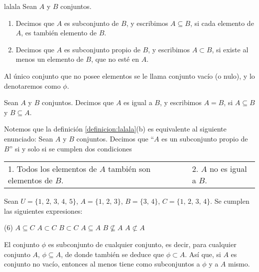 \begin{definicion}{}{lalala}
    Sean $A$ y $B$ conjuntos.
    \begin{enumerate}[label=\alph*)]
        \item Decimos que $A$ es subconjunto de $B$, y escribimos $A \subseteq B$, si cada elemento de $A$, es también elemento de $B$.
        \item Decimos que $A$ es subconjunto propio de $B$, y escribimos $A \subset B$, si existe al menos un elemento de $B$, que no esté en $A$.
    \end{enumerate}
\end{definicion}

\begin{definicion}{}{}
    Al único conjunto que no posee elementos se le llama conjunto vacío (o nulo), y lo denotaremos como $\phi$.
\end{definicion}

\begin{theorem}{}{}
    Sean $A$ y $B$ conjuntos. Decimos que $A$ es igual a $B$, y escribimos $A = B$, si $A \subseteq B$ y $B \subseteq A$.
\end{theorem}

\begin{obs}{}{}
    Notemos que la definición \ref{definicion:lalala}(b) es equivalente al siguiente enunciado: Sean $A$ y $B$ conjuntos. Decimos que “$A$ es un subconjunto propio de $B$” si y solo si se cumplen dos condiciones
    \begin{center}
        \begin{tabular}{llll}
           1. Todos los elementos de $A$ también son elementos de $B$. & & & 2. $A$ no es igual a $B$.
        \end{tabular}
    \end{center}
\end{obs}

\begin{myexample}
    Sean $U = \{ 1, \, 2, \, 3, \, 4, \, 5 \}$, $A = \{ 1, \, 2, \, 3 \}$, $B = \{ 3, \, 4 \}$, $C = \{ 1, \, 2, \, 3, \, 4 \}$. Se cumplen las siguientes expresiones:
    \begin{tasks}(6)
        \task $A \subseteq C$
        \task $A \subset C$
        \task $B \subset C$
        \task $A \subseteq A$
        \task $B \nsubseteq A$
        \task $A \not\subset A$
    \end{tasks}
\end{myexample}

\begin{importante}
    El conjunto $\phi$ es subconjunto de cualquier conjunto, es decir, para cualquier conjunto $A$, $\phi \subseteq A$, de donde también se deduce que $\phi \subset A$. Así que, si $A$ es conjunto no vacío, entonces al menos tiene como subconjuntos a $\phi$ y a $A$ mismo.
\end{importante}

